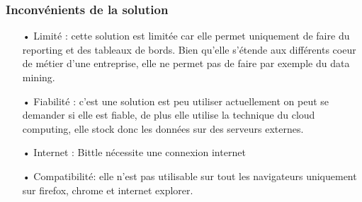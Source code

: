 \subsubsection{Inconvénients de la solution}

\begin{itemize}
\item[•]Limité : cette solution est limitée car elle permet uniquement de faire du reporting et des tableaux de bords. Bien qu'elle s'étende aux différents coeur de métier d'une entreprise, elle ne permet pas de faire par exemple du data mining.
\item[•] Fiabilité : c'est une solution est peu utiliser actuellement on peut se demander si elle est fiable, de plus elle utilise la technique du cloud computing, elle stock donc les données sur des serveurs externes.
\item[•]Internet : Bittle nécessite une connexion internet
\item[•]Compatibilité: elle n'est pas utilisable sur tout les navigateurs uniquement sur firefox, chrome et internet explorer.
\end{itemize}